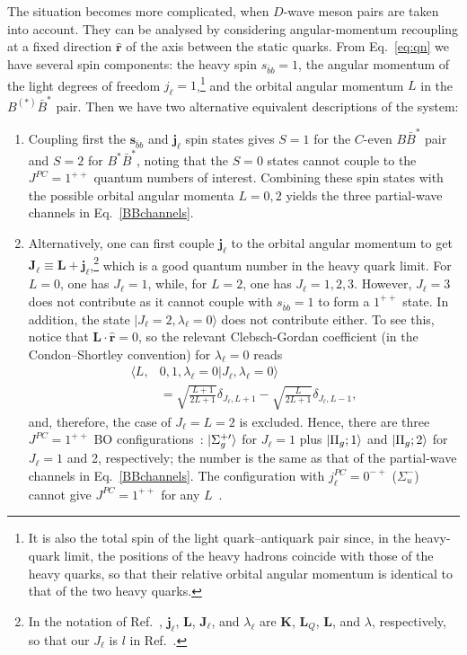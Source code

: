 \documentclass[aps,prd,showpacs,amsmath,twocolumn,superscriptaddress,floatfix,nofootinbib,notitlepage]{revtex4-2}
\newcommand{\ver}{{\bm r}}
\newcommand{\be}{\begin{equation}}
\newcommand{\ee}{\end{equation}}
\begin{document}
The situation becomes more complicated, when $D$-wave meson pairs are taken into account. They
can be analysed by considering angular-momentum recoupling at a fixed direction $\hat{\ver}$ of the axis between the static quarks. From Eq.~\eqref{eq:qn} we have several spin components: 
the heavy spin $s_{\bar{b}b} = 1$, the angular momentum of the light degrees of freedom ${j}_\ell=1$,\footnote{It is also the total spin of the light quark--antiquark pair since, in the heavy-quark limit, the positions of the heavy hadrons coincide with those of the heavy quarks, so that their relative orbital angular momentum is identical to that of the two heavy quarks.} and the orbital angular momentum $L$ in the $B^{(*)}\bar{B}^*$ pair. Then we have two alternative equivalent descriptions of the system:
\begin{enumerate}
\item Coupling first the $\bm{s}_{\bar{b}b}$ and $\bm{j}_\ell$ spin states gives $S=1$ for the $C$-even $B\bar{B}^*$ pair and $S=2$ for $B^*\bar{B}^*$, noting that the $S=0$ states cannot couple to the $J^{PC}=1^{++}$ quantum numbers of interest. Combining these spin states with the possible orbital angular momenta $L=0,2$ yields the three partial-wave channels in Eq.~\eqref{BBchannels}.
\item Alternatively, one can first 
couple $\bm{j}_\ell$ to the orbital angular momentum to get $\bm{J}_\ell\equiv\bm{L}+\bm{j}_\ell$,\footnote{In the notation of Ref.~\cite{Berwein:2024ztx}, $\bm j_\ell$, $\bm L$, $\bm J_\ell$, and $\lambda_\ell$ are $\bm K$, $\bm L_Q$, $\bm L$, and $\lambda$, respectively, so that our $J_\ell$ is $l$ in Ref.~\cite{Berwein:2024ztx}.} which is a good quantum number in the heavy quark limit. 
For $L=0$, one has $J_\ell =1$, while,
for $L=2$, one has $J_\ell =1,2,3$. However, $J_\ell=3$ does not contribute as it cannot couple with $s_{\bar{b}b} = 1$ to form a $1^{++}$ state. In addition, 
the state $|J_\ell=2,\lambda_\ell=0\rangle$ does not contribute either. To see this, notice that $\bm{L}\cdot\hat{\ver}=0$, so the relevant Clebsch-Gordan coefficient (in the Condon--Shortley convention) for $\lambda_\ell=0$ reads
\be
\begin{split}
\langle L,&0,1,\lambda_\ell=0|J_\ell,\lambda_\ell=0\rangle\\
&=\sqrt{\frac{L+1}{2L+1}}\delta_{J_\ell,L+1}-\sqrt{\frac{L}{2L+1}}\delta_{J_\ell,L-1},
\end{split}
\ee
and, therefore, the case of $J_\ell=L=2$ is excluded. Hence, there are three $J^{PC}=1^{++}$ BO configurations~\cite{Brambilla:2026zfw}: 
$\ket{\Sigma_g^{+\prime}}$ for $J_\ell=1$ plus $\ket{\Pi_g;1}$ and $\ket{\Pi_g;2}$ for $J_\ell=1$ and 2, respectively; the number is the same as that of the partial-wave channels in Eq.~\eqref{BBchannels}. The configuration with $j_\ell^{PC}=0^{-+}$ ($\Sigma_u^-$) cannot give $J^{PC}=1^{++}$ for any $L$~\cite{Berwein:2024ztx,Brambilla:2026zfw}.
\end{enumerate}
\end{document}
